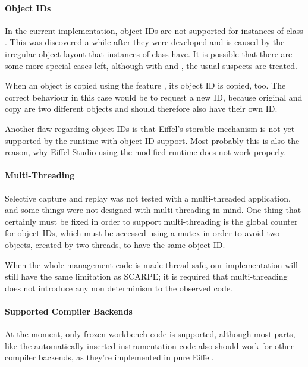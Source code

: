 \paragraph{Object IDs}
In the current implementation, object IDs are not supported for instances of class . This was discovered a while after they were developed and is caused by the irregular object layout that instances of class  have. It is possible that there are some more special cases left, although with  and , the usual suspects are treated.

When an object is copied using the feature , its object ID is copied, too. The correct behaviour in this case would be to request a new ID, because original and copy are two different objects and should therefore also have their own ID.

Another flaw regarding object IDs is that Eiffel's storable mechanism is not yet supported by the runtime with object ID support. Most probably this is also the reason, why Eiffel Studio using the modified runtime does not work properly.

\paragraph{Multi-Threading}
Selective capture and replay was not tested with a multi-threaded application, and some things were not designed with multi-threading in mind. One thing that certainly must be fixed in order to support multi-threading is the global counter for object IDs, which must be accessed using a mutex in order to avoid two objects, created by two threads, to have the same object ID.

When the whole management code is made thread safe, our implementation will still have the same limitation as SCARPE; it is required that multi-threading does not introduce any non determinism to the observed code.

\paragraph{Supported Compiler Backends}
At the moment, only frozen workbench code is supported, although most parts, like the automatically inserted instrumentation code also should work for other compiler backends, as they're implemented in pure Eiffel.
